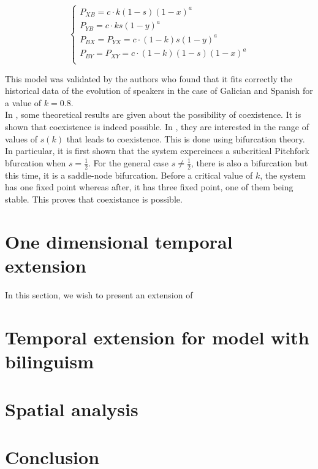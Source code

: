 \documentclass{article}
\begin{document}
\[
\begin{cases}
P_{XB} = c \cdot k (1-s) (1-x)^a \\
P_{YB} = c \cdot k s (1-y)^a \\
P_{BX} = P_{YX} = c \cdot (1-k) s (1-y)^a \\
P_{BY} = P_{XY} = c \cdot (1-k) (1-s) (1-x)^a \\
\end{cases}
\]

This model was validated by the authors who found that it fits correctly the historical data of the evolution of speakers in the case of Galician and Spanish for a value of $k = 0.8$. \\
In \cite{BAGGS19939}, some theoretical results are given about the possibility of coexistence. It is shown that coexistence is indeed possible. In \cite{bilingual}, they are interested in the range of values of $s(k)$ that leads to coexistence. This is done using bifurcation theory. In particular, it is first shown that the system expereinces a subcritical Pitchfork bfurcation when $s = \frac{1}{2}$. For the general case $s \ne \frac{1}{2}$, there is also a bifurcation but this time, it is a saddle-node bifurcation. Before a critical value of $k$, the system has one fixed point whereas after, it has three fixed point, one of them being stable. This proves that coexistance is possible.

\section{One dimensional temporal extension}
\label{sec:1d}
In this section, we wish to present an extension of

\section{Temporal extension for model with bilinguism}
\label{sec:2d}

\section{Spatial analysis}
\label{sec:spatial}

\section{Conclusion}
\label{sec:conclusion}





\end{document}

